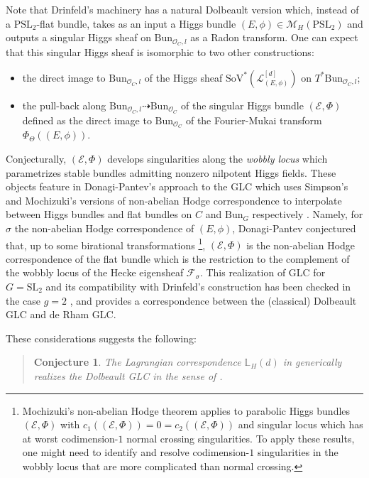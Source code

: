 \documentclass[twoside, 11pt]{article}
\numberwithin{equation}{section}
\theoremstyle{theorem}
\numberwithin{theorem}{section}
\newtheorem{conjecture}[conjecture]{Conjecture}
\theoremstyle{definition}
\begin{document}
Note that Drinfeld's machinery has a natural Dolbeault version which, instead of a $\mathrm{PSL}_2$-flat bundle, takes as an input a Higgs bundle $(E, \phi) \in \mathcal{M}_H(\mathrm{PSL}_2)$ and outputs a singular Higgs sheaf on $\mathrm{Bun}_{\mathcal{O}_C, l}$ as a Radon transform.
One can expect that this singular Higgs sheaf is isomorphic to two other constructions: 
\begin{itemize}
    \item the direct image to $\mathrm{Bun}_{\mathcal{O}_C, l}$ of the Higgs sheaf $\mathrm{SoV}^\ast \left( \mathcal{L}_{(E,\phi)}^{[d]} \right)$ on $T^\ast\mathrm{Bun}_{\mathcal{O}_C, l}$;
    \item the pull-back along $\mathrm{Bun}_{\mathcal{O}_C, l} \dashrightarrow \mathrm{Bun}_{\mathcal{O}_C}$ of the singular Higgs bundle $(\mathcal{E}, \Phi)$ defined as the direct image 
to $\mathrm{Bun}_{\mathcal{O}_C}$ of the Fourier-Mukai transform $\Phi_\Theta((E, \phi))$. 
\end{itemize}
Conjecturally, $(\mathcal{E}, \Phi)$ develops singularities along the \textit{wobbly locus} which parametrizes stable bundles admitting nonzero nilpotent Higgs fields.
These objects feature in Donagi-Pantev's approach to the GLC which uses Simpson's and Mochizuki's versions of non-abelian Hodge correspondence to interpolate between Higgs bundles and flat bundles on $C$ and $\mathrm{Bun}_G$ respectively \cite{Simpson1991, Simpson1992, Simpson1997, Mochizuki2006, Mochizuki2009, DP09, DonagiPantev2012}. 
Namely, for $\sigma$ the non-abelian Hodge correspondence of $(E, \phi)$, Donagi-Pantev conjectured that, up to some birational transformations
\footnote{Mochizuki's non-abelian Hodge theorem applies to parabolic Higgs bundles $(\mathcal{E}, \Phi)$ with $c_1((\mathcal{E}, \Phi)) = 0 = c_2((\mathcal{E}, \Phi))$ and singular locus which has at worst codimension-$1$ normal crossing singularities. To apply these results, one might need to identify and resolve codimension-$1$ singularities in the wobbly locus that are more complicated than normal crossing.}, 
$(\mathcal{E}, \Phi)$ is the non-abelian Hodge correspondence of the flat bundle which is the restriction to the complement of the wobbly locus of the Hecke eigensheaf $\mathcal{F}_\sigma$. 
This realization of GLC for $G = \mathrm{SL}_2$ and its compatibility with Drinfeld's construction has been checked in the case $g = 2$ \cite{DPS24}, and provides a correspondence between the (classical) Dolbeault GLC and de Rham GLC.

These considerations suggests the following:
\vspace{-24pt}
\begin{quote}
\begin{conjecture}
    The Lagrangian correspondence $\mathbb{L}_H(d)$ in  generically realizes the Dolbeault GLC in the sense of \cite{Drinfeld, DP09, DonagiPantev2012, Arinkin2012}. 
\end{conjecture}
\end{quote}
\end{document}

